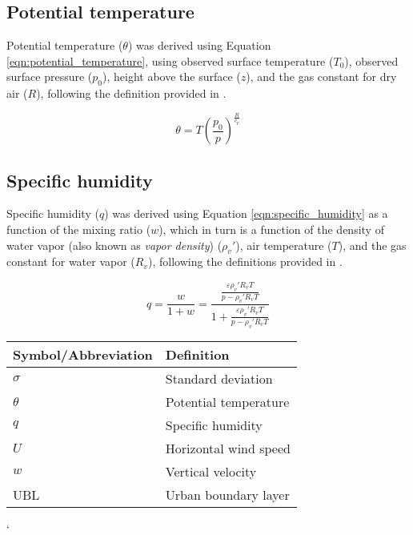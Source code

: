 \subsection*{Potential temperature}

Potential temperature ($\theta$) was derived using Equation \ref{eqn:potential_temperature}, using observed surface temperature ($T_0$), observed surface pressure ($p_0$), height above the surface ($z$), and the gas constant for dry air ($R$), following the definition provided in \citet{wallace2006}.

\begin{equation*}\label{eqn:potential_temperature}
	\theta = T \left(\frac{p_0}{p} \right)^{\frac{R}{c_p}}
\end{equation*}

\subsection*{Specific humidity}

Specific humidity ($q$) was derived using Equation \ref{eqn:specific_humidity} as a function of the mixing ratio ($w$), which in turn is a function of the density of water vapor (also known as \textit{vapor density}) ($\rho_v'$), air temperature ($T$), and the gas constant for water vapor ($R_v$), following the definitions provided in \citet{wallace2006}. 

\begin{equation*}\label{eqn:specific_humidity}
	q = \frac{w}{1+w} = \frac{\frac{\varepsilon \rho_v' R_v T}{p - \rho_v' R_v T}}{1+\frac{\varepsilon \rho_v' R_v T}{p - \rho_v' R_v T}} 
\end{equation*}

\label{tab:symbols}
\begin{center}
	\begin{tabularx}{0.75\textwidth}{l X}
 		\hline
 		Symbol/Abbreviation & Definition \\
 		\hline
 		$\sigma$ & Standard deviation \\
 		$\theta$ & Potential temperature \\
 		$q$ & Specific humidity \\
 		$U$ & Horizontal wind speed \\
 		$w$ & Vertical velocity \\
 		UBL & Urban boundary layer \\
 		\hline
	\end{tabularx}
\end{center}`